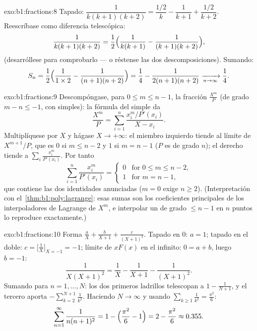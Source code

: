 \begin{solution}{exo:b1:fractions:8}
Tapado: $\dfrac{1}{k(k+1)(k+2)} = \dfrac{1/2}{k} - \dfrac{1}{k+1} +
\dfrac{1/2}{k+2}$. Reescríbase como diferencia telescópica:
\[
\frac{1}{k(k+1)(k+2)}
= \frac12\Bigl(\frac{1}{k(k+1)} - \frac{1}{(k+1)(k+2)}\Bigr),
\]
(desarróllese para comprobarlo --- o réstense las dos descomposiciones). Sumando:
\[
S_n = \frac12\Bigl(\frac{1}{1 \times 2} - \frac{1}{(n+1)(n+2)}\Bigr)
= \frac14 - \frac{1}{2(n+1)(n+2)}
\xrightarrow[n \to \infty]{} \frac14 .
\]
\end{solution}

\begin{solution}{exo:b1:fractions:9}
Descompóngase, para $0 \leq m \leq n - 1$, la fracción
$\frac{X^m}{P}$ (de grado $m - n \leq -1$, con  simples): la
fórmula del  simple da
\[
\frac{X^m}{P} = \sum_{i=1}^{n} \frac{x_i^m / P'(x_i)}{X - x_i} .
\]
Multiplíquese por $X$ y hágase $X \to +\infty$: el miembro izquierdo
tiende al límite de $X^{m+1}/P$, que es $0$ si $m \leq n - 2$ y $1$ si
$m = n - 1$ ($P$ es  de grado $n$); el derecho tiende a
$\sum_i \frac{x_i^m}{P'(x_i)}$. Por tanto
\[
\sum_{i=1}^{n} \frac{x_i^{m}}{P'(x_i)} =
\begin{cases}
0 & \text{for } 0 \leq m \leq n-2,\\
1 & \text{for } m = n - 1,
\end{cases}
\]
que contiene las dos identidades anunciadas ($m = 0$ exige $n \geq 2$).
(Interpretación con el~\cref{thm:b1:poly:lagrange}: esas sumas son los
coeficientes principales de los interpoladores de Lagrange de $X^m$, e
interpolar un  de grado $\leq n-1$ en $n$ puntos lo reproduce
exactamente.)
\end{solution}

\begin{solution}{exo:b1:fractions:10}
Forma $\frac aX + \frac b{X+1} + \frac c{(X+1)^2}$. Tapado en $0$:
$a = 1$; tapado en el  doble:
$c = \bigl[\frac1X \bigr]_{X=-1} = -1$; límite de $xF(x)$ en el
infinito: $0 = a + b$, luego $b = -1$:
\[
\frac{1}{X(X+1)^2} = \frac1X - \frac1{X+1} - \frac1{(X+1)^2} .
\]
Sumando para $n = 1, \dots, N$: los dos primeros ladrillos telescopan a
$1 - \frac1{N+1}$, y el tercero aporta $-\sum_{k=2}^{N+1}\frac1{k^2}$.
Haciendo $N \to \infty$ y usando
$\sum_{k\geq1}\frac1{k^2} = \frac{\pi^2}6$:
\[
\sum_{n=1}^{\infty}\frac{1}{n(n+1)^2}
= 1 - \Bigl(\frac{\pi^2}6 - 1\Bigr) = 2 - \frac{\pi^2}6
\approx 0.355 .
\]
\end{solution}

